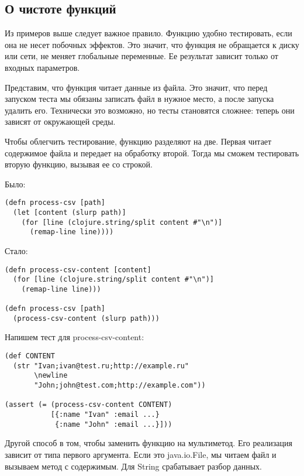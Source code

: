\subsection{О чистоте функций}

Из примеров выше следует важное правило. Функцию удобно тестировать, если она не
несет побочных эффектов. Это значит, что функция не обращается к диску или сети,
не меняет глобальные переменные. Ее результат зависит только от входных
параметров.

Представим, что функция читает данные из файла. Это значит, что перед запуском
теста мы обязаны записать файл в нужное место, а после запуска удалить
его. Технически это возможно, но тесты становятся сложнее: теперь они зависят от
окружающей среды.

Чтобы облегчить тестирование, функцию разделяют на две. Первая читает содержимое
файла и передает на обработку второй. Тогда мы сможем тестировать вторую
функцию, вызывая ее со строкой.

Было:

\begin{verbatim}
(defn process-csv [path]
  (let [content (slurp path)]
    (for [line (clojure.string/split content #"\n")]
      (remap-line line))))
\end{verbatim}

Стало:

\begin{verbatim}
(defn process-csv-content [content]
  (for [line (clojure.string/split content #"\n")]
    (remap-line line)))

(defn process-csv [path]
  (process-csv-content (slurp path)))
\end{verbatim}

Напишем тест для process-csv-content:

\begin{verbatim}
(def CONTENT
  (str "Ivan;ivan@test.ru;http://example.ru"
       \newline
       "John;john@test.com;http://example.com"))

(assert (= (process-csv-content CONTENT)
           [{:name "Ivan" :email ...}
            {:name "John" :email ...}]))
\end{verbatim}

Другой способ в том, чтобы заменить функцию на мультиметод. Его реализация
зависит от типа первого аргумента. Если это java.io.File, мы читаем файл и
вызываем метод с содержимым. Для String срабатывает разбор данных.


